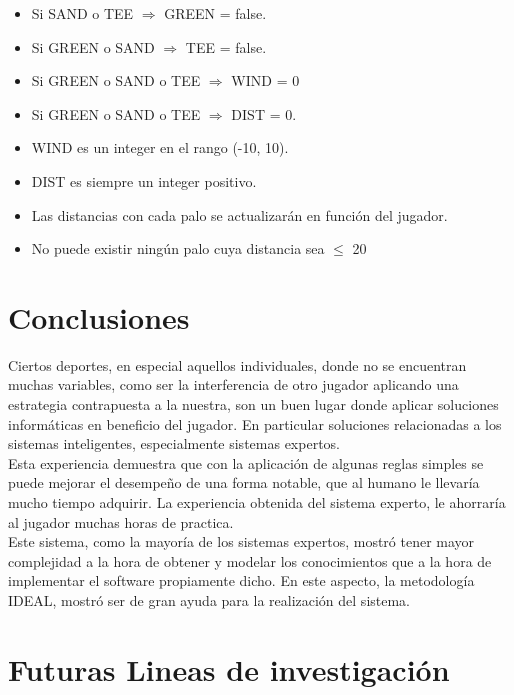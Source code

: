 \documentclass[runningheads,a4paper]{llncs}
\begin{document}
\begin{itemize}

	\item Si SAND o TEE $\Rightarrow$ GREEN = false.

	\item Si GREEN o SAND $\Rightarrow$ TEE = false.

	\item Si GREEN o SAND o TEE $\Rightarrow$ WIND = 0 

	\item Si GREEN o SAND o TEE $\Rightarrow$ DIST = 0.

	\item WIND es un integer en el rango (-10, 10).

	\item DIST es siempre un integer positivo.

  \item Las distancias con cada palo se actualizarán en función del jugador.

  \item No puede existir ningún palo cuya distancia sea $\leq$ 20

\end{itemize}


\section{Conclusiones}

  Ciertos deportes, en especial aquellos individuales, donde no se encuentran
  muchas variables, como ser la interferencia de otro jugador aplicando una
  estrategia contrapuesta a la nuestra, son un buen lugar donde aplicar
  soluciones informáticas en beneficio del jugador. En particular soluciones
  relacionadas a los sistemas inteligentes, especialmente sistemas expertos.\\
  Esta experiencia demuestra que con la aplicación de algunas reglas simples se
  puede mejorar el desempeño de una forma notable, que al humano le llevaría
  mucho tiempo adquirir. La experiencia obtenida del sistema experto, le
  ahorraría al jugador muchas horas de practica.\\ Este sistema, como la mayoría
  de los sistemas expertos, mostró tener mayor complejidad a la hora de  obtener
  y modelar los conocimientos que a la hora de implementar el software
  propiamente dicho. En este aspecto, la metodología IDEAL, mostró ser de gran
  ayuda para la realización del sistema.

\section{Futuras Lineas de investigación}
\end{document}

